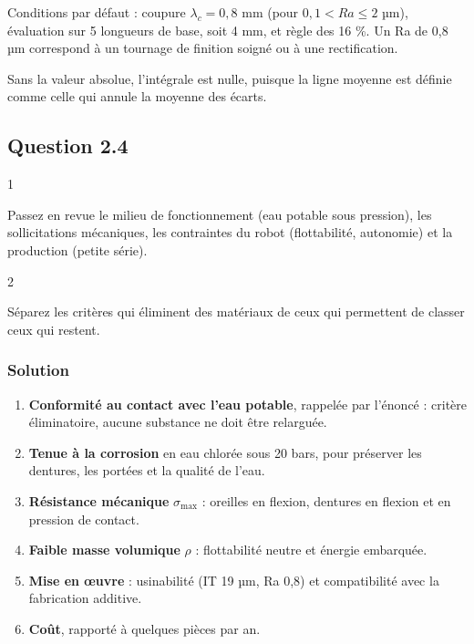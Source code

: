 \documentclass[11pt,a4paper]{article}
\providecommand{\tightlist}{\setlength{\itemsep}{0pt}\setlength{\parskip}{0pt}}
\newcommand{\equationajustee}[1]{%
  \sbox{\boiteequation}{$\displaystyle #1$}%
  \ifdim\wd\boiteequation>\linewidth
    \[\resizebox{\linewidth}{!}{\usebox{\boiteequation}}\]%
  \else
    \[#1\]%
  \fi}
\begin{document}
\equationajustee{\boxed{Ra = \frac{1}{l_r}\int_0^{l_r}\lvert z(x)\rvert\,\mathrm{d}x}}

Conditions par défaut : coupure \(\lambda_c = 0{,}8\) mm (pour \(0{,}1 < Ra\le 2\) µm), évaluation sur 5 longueurs de base, soit 4 mm, et règle des 16 \%. Un Ra de 0,8 µm correspond à un tournage de finition soigné ou à une rectification.

\begin{piege}

Sans la valeur absolue, l'intégrale est nulle, puisque la ligne moyenne est définie comme celle qui annule la moyenne des écarts.

\end{piege}

\hypertarget{question-2.4}{%
\subsection{Question 2.4}\label{question-2.4}}

\begin{indication}{1}

Passez en revue le milieu de fonctionnement (eau potable sous pression), les sollicitations mécaniques, les contraintes du robot (flottabilité, autonomie) et la production (petite série).

\end{indication}

\begin{indication}{2}

Séparez les critères qui éliminent des matériaux de ceux qui permettent de classer ceux qui restent.

\end{indication}

\hypertarget{solution-17}{%
\subsubsection{Solution}\label{solution-17}}

\begin{enumerate}
\def\labelenumi{\arabic{enumi}.}
\tightlist
\item
  \textbf{Conformité au contact avec l'eau potable}, rappelée par l'énoncé : critère éliminatoire, aucune substance ne doit être relarguée.
\item
  \textbf{Tenue à la corrosion} en eau chlorée sous 20 bars, pour préserver les dentures, les portées et la qualité de l'eau.
\item
  \textbf{Résistance mécanique} \(\sigma_{\max}\) : oreilles en flexion, dentures en flexion et en pression de contact.
\item
  \textbf{Faible masse volumique} \(\rho\) : flottabilité neutre et énergie embarquée.
\item
  \textbf{Mise en œuvre} : usinabilité (IT 19 µm, Ra 0,8) et compatibilité avec la fabrication additive.
\item
  \textbf{Coût}, rapporté à quelques pièces par an.
\end{enumerate}
\end{document}
